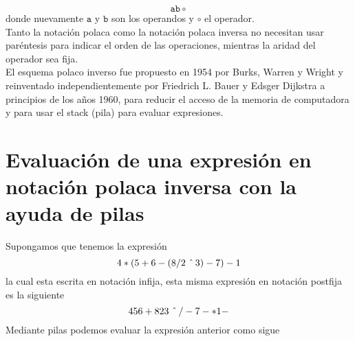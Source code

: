 \documentclass[12pt ]{article}
\begin{document}
$$  \mathtt{a} \mathtt{b}\circ$$
donde nuevamente $\mathtt{a}$ y $\mathtt{b}$ son los operandos y $\circ$ el operador.\\
 Tanto la notación polaca como la notación polaca inversa no necesitan usar paréntesis para indicar el orden de las operaciones, mientras la aridad del operador sea fija.\\
 El esquema polaco inverso fue propuesto en 1954 por Burks, Warren y Wright y reinventado independientemente por Friedrich L. Bauer y Edsger Dijkstra a principios de los años 1960, para reducir el acceso de la memoria de computadora y para usar el stack (pila) para evaluar expresiones.

 \section{Evaluación de una expresión en notación polaca inversa con la ayuda de pilas}
 Supongamos que tenemos la expresión  $$4*(5+6-(8/2\hspace{0.2 cm}\hat{}\hspace{0.15 cm}3)-7)-1$$ la cual esta escrita en notación infija, esta misma expresión en notación postfija es la siguiente
 $$456+823 \hspace{0.2 cm}\hat{}\hspace{0.15 cm}/-7-*1-$$
 Mediante pilas podemos evaluar la expresión anterior como sigue
\end{document}
